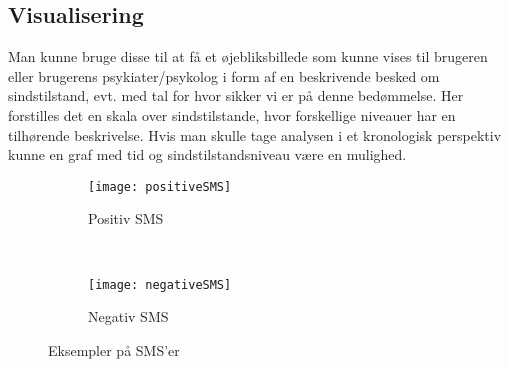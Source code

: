 \begin{comment}
Til dette skulle man bruge træningsdata som kan bruges til at opbygge en sentiment analysis classifier, eksempelvis Naïve Bayes Classifier. Denne classifier vil så kunne bruges til at vurdere sindstilstand for brugere. Hvis træningsdata ikke er tilgængeligt kunne man se på negative eller positive ord og hvordan de bruges i SMS teksten.

\end{comment}

\subsection{Visualisering}
Man kunne bruge disse til at få et øjebliksbillede som kunne vises til brugeren eller brugerens psykiater/psykolog i form af en beskrivende besked om sindstilstand, evt. med tal for hvor sikker vi er på denne bedømmelse. Her forstilles det en skala over sindstilstande, hvor forskellige niveauer har en tilhørende beskrivelse.
Hvis man skulle tage analysen i et kronologisk perspektiv kunne en graf med tid og sindstilstandsniveau være en mulighed. 

\begin{figure}
	\centering
	\begin{subfigure}[b]{0.3\textwidth}
		\texttt{[image: positiveSMS]}
		\caption{Positiv SMS}
	\end{subfigure}
	~
	\begin{subfigure}[b]{0.3\textwidth}
		\texttt{[image: negativeSMS]}
		\caption{Negativ SMS}
	\end{subfigure}
	\caption{Eksempler på SMS'er}
\end{figure}
	
	